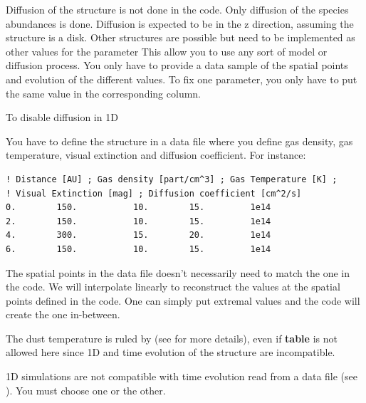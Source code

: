 \documentclass[english,a4paper,twoside]{article}
\begin{document}
Diffusion of the structure is not done in the code. Only diffusion of the species abundances is done. Diffusion is expected to 
be in the z direction, assuming the structure is a disk. Other structures are possible but need to be implemented as other 
values for the parameter  This allow you to use any sort of model or diffusion 
process. You only have to provide a data sample of the spatial points and evolution of the different values. To fix one 
parameter, you only have to put the same value in the corresponding column.

To disable diffusion in 1D

You have to define the structure in a data file  where you define gas density, gas temperature, visual extinction and diffusion coefficient. For instance:
\begin{verbatim}
! Distance [AU] ; Gas density [part/cm^3] ; Gas Temperature [K] ; 
! Visual Extinction [mag] ; Diffusion coefficient [cm^2/s]
0.        150.           10.        15.         1e14
2.        150.           10.        15.         1e14
4.        300.           15.        20.         1e14
6.        150.           10.        15.         1e14
\end{verbatim}

The spatial points in the data file doesn't necessarily need to match the one in the code. We will interpolate linearly to reconstruct the values at the spatial points defined in the code. One can simply put extremal values and the code will create the one in-between. 

The dust temperature is ruled by  (see  for more details), even if \textbf{table} is not allowed here since 1D and time evolution of the structure are incompatible.

\begin{attention}
1D simulations are not compatible with time evolution read from a data file (see ). You must choose one or the other.
\end{attention}
\end{document}
